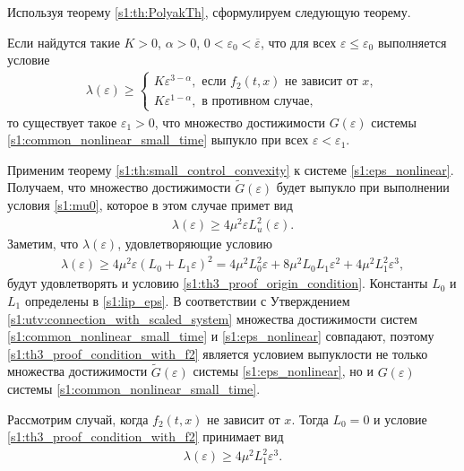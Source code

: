 \documentclass[../main.tex]{subfiles}
\begin{document}
Используя теорему \ref{s1:th:PolyakTh}, сформулируем следующую теорему.
\begin{theorem}\label{s1:th:small_time_convexity}
 Если найдутся такие $K > 0$, $ \alpha > 0$, $ 0 < \varepsilon_0 < \overline{\varepsilon}$, что для всех $\varepsilon \leqslant \varepsilon_0$ выполняется условие
 \begin{gather}\label{s1:small_time_convexity_condition}
 \lambda(\varepsilon) \geqslant \left\{ {\begin{array}{*{20}{l}}
 {K\varepsilon ^{3 - \alpha}, \mbox{\ если \ } f_2(t,x) \mbox{\ не зависит от \ } x}, \\
 {K\varepsilon ^{1 - \alpha}}, \mbox{\ в противном случае},
 \end{array}} \right.
 \end{gather}
 то существует такое $ \varepsilon_1 > 0 $, что множество достижимости $G(\varepsilon)$ системы \eqref{s1:common_nonlinear_small_time} выпукло при всех $\varepsilon < \varepsilon_1 $.
 \end{theorem}
 \doc
Применим теорему \ref{s1:th:small_control_convexity} к системе \eqref{s1:eps_nonlinear}. 
Получаем, что множество достижимости $\widetilde{G}(\varepsilon)$ будет выпукло при выполнении условия \eqref{s1:mu0}, которое в этом случае примет вид
 \begin{gather}\label{s1:th3_proof_origin_condition}
 \lambda(\varepsilon) \geqslant 4 \mu^2 \varepsilon L_u^2 (\varepsilon).
 \end{gather}
 Заметим, что $ \lambda(\varepsilon) $, удовлетворяющие условию 
 \begin{gather}\label{s1:th3_proof_condition_with_f2}
 	 \lambda(\varepsilon) \geqslant 4 \mu^2 \varepsilon (L_0 + L_1 \varepsilon)^2 = 4 \mu^2 L_0^2 \varepsilon + 8 \mu^2 L_0 L_1 \varepsilon^2 + 4 \mu^2 L_1^2 \varepsilon^3,
 \end{gather}
 будут удовлетворять и условию \eqref{s1:th3_proof_origin_condition}. 
 Константы $L_0$ и $L_1$ определены в \eqref{s1:lip_eps}. 
 В соответствии с Утверждением \ref{s1:utv:connection_with_scaled_system} множества достижимости систем \eqref{s1:common_nonlinear_small_time} и \eqref{s1:eps_nonlinear} совпадают, поэтому \eqref{s1:th3_proof_condition_with_f2} является условием выпуклости не только множества достижимости $\widetilde{G}(\varepsilon)$ системы \eqref{s1:eps_nonlinear}, но и $G(\varepsilon)$ системы \eqref{s1:common_nonlinear_small_time}.
 
 Рассмотрим случай, когда $f_2(t,x)$ не зависит от $x$.
 Тогда $L_0 = 0$ и условие \eqref{s1:th3_proof_condition_with_f2} принимает вид
 \begin{gather}\label{s1:th3_proof_condition_without_f2}
 	\lambda(\varepsilon) \geqslant 4 \mu^2 L_1^2 \varepsilon^3.
 \end{gather}
 
\end{document}
